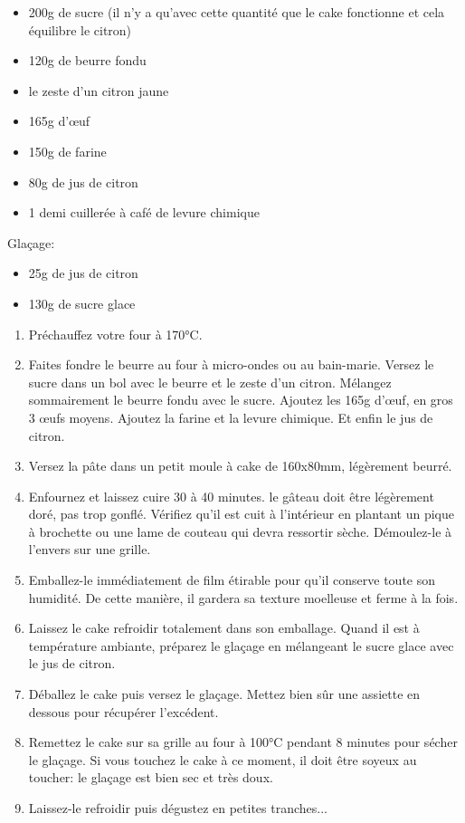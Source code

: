 \bigskip
{}
{}{\begin{itemize}
	\item 200g de sucre (il n'y a qu'avec cette quantité que le cake fonctionne et cela équilibre le citron)
	\item 120g de beurre fondu
	\item le zeste d'un citron jaune
	\item 165g d'œuf
	\item 150g de farine
	\item 80g de jus de citron
	\item 1 demi cuillerée à café de levure chimique
\end{itemize}
Glaçage:
\begin{itemize}
	\item 25g de jus de citron
	\item 130g de sucre glace
\end{itemize}}
{\begin{enumerate}
	\item Préchauffez votre four à 170°C.
	\item Faites fondre le beurre au four à micro-ondes ou au bain-marie. Versez le sucre dans un bol avec le beurre et le zeste d'un citron. Mélangez sommairement le beurre fondu avec le sucre. Ajoutez les 165g d'œuf, en gros 3 œufs moyens. Ajoutez la farine et la levure chimique. Et enfin le jus de citron.
	\item Versez la pâte dans un petit moule à cake de 160x80mm, légèrement beurré.
	\item Enfournez et laissez cuire 30 à 40 minutes. le gâteau doit être légèrement doré, pas trop gonflé. Vérifiez qu'il est cuit à l'intérieur en plantant un pique à brochette ou une lame de couteau qui devra ressortir sèche. Démoulez-le à l'envers sur une grille.
	\item Emballez-le immédiatement de film étirable pour qu'il conserve toute son humidité. De cette manière, il gardera sa texture moelleuse et ferme à la fois.
	\item Laissez le cake refroidir totalement dans son emballage. Quand il est à température ambiante, préparez le glaçage en mélangeant le sucre glace avec le jus de citron.
	\item Déballez le cake puis versez le glaçage. Mettez bien sûr une assiette en dessous pour récupérer l'excédent. 
	\item Remettez le cake sur sa grille au four à 100°C pendant 8 minutes pour sécher le glaçage. Si vous touchez le cake à ce moment, il doit être soyeux au toucher: le glaçage est bien sec et très doux. 
	\item Laissez-le refroidir puis dégustez en petites tranches...
\end{enumerate}}

